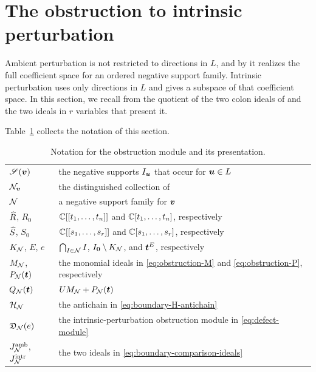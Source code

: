 \section{The obstruction to intrinsic perturbation}
\label{sec:lattice-obstruction}

Ambient perturbation is not restricted to directions in \(L\), and by \cite[Theorem~5.5]{OS25} it realizes the full coefficient space for an ordered negative support family.
Intrinsic perturbation uses only directions in \(L\) and gives a subspace of that coefficient space.
In this section, we recall from \cite{Nak26} the quotient of the two colon ideals of \cite[Proposition~6.2]{OS25} and the two ideals in \(r\) variables that present it.

Table~\ref{tab:obstruction-notation} collects the notation of this section.
\begin{table}[ht]
	\centering
	\small
	\begin{tabular}{@{}p{.29\linewidth}p{.65\linewidth}@{}}
		\(\mathscr S(\boldsymbol{v})\)                            &
		the negative supports \(I_{\boldsymbol{u}}\) that occur for \(\boldsymbol{u}\in L\)                               \\
		\(\mathcal N_{\boldsymbol{v}}\)                           &
		the distinguished collection of \cite[Section~3]{OS25}                                      \\
		\(\mathcal N\)                                 &
		a negative support family for \(\boldsymbol{v}\)                                                       \\
		\(\widehat R\), \(R_0\)                      &
		\(\mathbb C[[t_1,\ldots,t_n]]\) and \(\mathbb C[t_1,\ldots,t_n]\), respectively                           \\
		\(\widehat S\), \(S_0\)                      &
		\(\mathbb C[[s_1,\ldots,s_r]]\) and \(\mathbb C[s_1,\ldots,s_r]\), respectively                           \\
		\(K_{\mathcal N}\), \(E\), \(e\)               &
		\(\bigcap_{I\in\mathcal N}I\),
		\(I_{\boldsymbol{0}}\setminus K_{\mathcal N}\), and
		\(\boldsymbol{t}^E\), respectively                                                                     \\
		\(M_{\mathcal N}\), \(P_{\mathcal N}(\boldsymbol{t})\)           &
		the monomial ideals in \eqref{eq:obstruction-M} and \eqref{eq:obstruction-P}, respectively  \\
		\(Q_{\mathcal N}(\boldsymbol{t})\)                        &
		\(UM_{\mathcal N}+P_{\mathcal N}(\boldsymbol{t})\)                                                                   \\
		\(\mathcal H_{\mathcal N}\)                           &
		the antichain in \eqref{eq:boundary-H-antichain}                                            \\
		\(\mathfrak D_{\mathcal N}(e)\)                        &
		the intrinsic-perturbation obstruction module in \eqref{eq:defect-module}                   \\
		\(J_{\mathcal N}^{\mathrm{amb}}\), \(J_{\mathcal N}^{\mathrm{intr}}\) &
		the two ideals in \eqref{eq:boundary-comparison-ideals}
	\end{tabular}
	\caption{Notation for the obstruction module and its presentation.}
	\label{tab:obstruction-notation}
\end{table}

